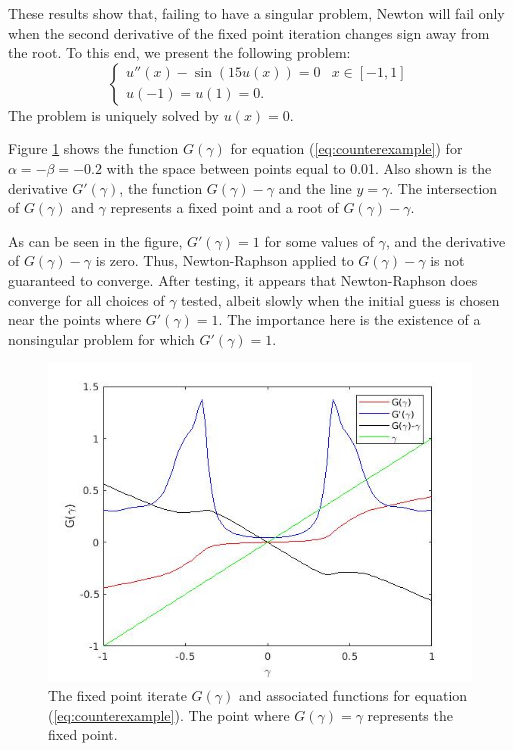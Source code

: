 \documentclass{book}
\begin{document}
These results show that, failing to have a singular problem, Newton will fail only when the second derivative of the fixed point iteration changes sign away from the root.
To this end, we present the following problem:
\begin{equation}
\label{eq:counterexample}
\begin{cases} u''(x) - \sin \left ( 15 u(x) \right ) = 0 & x \in [-1,1] \\
u(-1) = u(1) = 0 . \end{cases}
\end{equation}
The problem is uniquely solved by $u(x) = 0$.

Figure \ref{fig:exp8} shows the function $G(\gamma)$ for equation (\ref{eq:counterexample}) for $\alpha = - \beta = -0.2$ with the space between points equal to 0.01.
Also shown is the derivative $G'(\gamma)$, the function $G(\gamma) - \gamma$ and the line $y = \gamma$.
The intersection of $G(\gamma)$ and $\gamma$ represents a fixed point and a root of $G(\gamma) - \gamma$.

As can be seen in the figure, $G'(\gamma) = 1$ for some values of $\gamma$, and the derivative of $G(\gamma) - \gamma$ is zero.
Thus, Newton-Raphson applied to $G(\gamma) - \gamma$ is not guaranteed to converge.
After testing, it appears that Newton-Raphson does converge for all choices of $\gamma$ tested, albeit slowly when the initial guess is chosen near the points where $G'(\gamma) = 1$.
The importance here is the existence of a nonsingular problem for which $G'(\gamma) = 1$.

\begin{figure}
\centering
\includegraphics[width=\textwidth]{exp8_01.jpg}
\caption{The fixed point iterate $G(\gamma)$ and associated functions for equation (\ref{eq:counterexample}).
The point where $G(\gamma) = \gamma$ represents the fixed point.}
\label{fig:exp8}
\end{figure}
\end{document}
